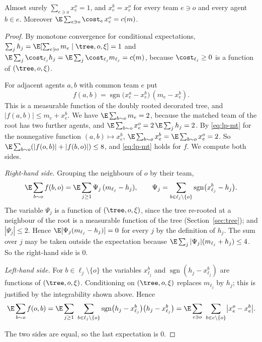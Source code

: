 \begin{lemma}\label{lem:lp-conditional}
Almost surely $\sum_{e\ni o}x^o_e=1$, and $x^b_e=x^o_e$ for every team $e\ni o$ and every
agent $b\in e$. Moreover $\E\sum_{e\ni o}\cost_e\,x^o_e=c(m)$.
\end{lemma}

\begin{proof}
By monotone convergence for conditional expectations,
$\sum_jh_j=\E[\sum_{e\ni o}m_e\mid\tree,o,\xi]=1$ and
$\E\sum_j\cost_{\ell_j}h_j=\E\sum_j\cost_{\ell_j}m_{\ell_j}=c(m)$, because $\cost_{\ell_j}\ge0$
is a function of $(\tree,o,\xi)$.

For adjacent agents $a,b$ with common team $e$ put
\[
f(a,b)=\operatorname{sgn}\bigl(x^a_e-x^b_e\bigr)\,(m_e-x^b_e).
\]
This is a measurable function of the doubly rooted decorated tree, and
$|f(a,b)|\le m_e+x^b_e$. We have $\E\sum_{b\sim o}m_e=2$, because the matched team of the
root has two further agents, and $\E\sum_{b\sim o}x^o_e=2\,\E\sum_jh_j=2$. By
\eqref{eq:lp-mt} for the nonnegative function $(a,b)\mapsto x^b_e$,
$\E\sum_{b\sim o}x^b_e=\E\sum_{b\sim o}x^o_e=2$. So
$\E\sum_{b\sim o}(|f(o,b)|+|f(b,o)|)\le8$, and \eqref{eq:lp-mt} holds for $f$. We compute
both sides.

\emph{Right-hand side.} Grouping the neighbours of $o$ by their team,
\[
\E\sum_{b\sim o}f(b,o)=\E\sum_{j\ge1}\Psi_j\,(m_{\ell_j}-h_j),\qquad
\Psi_j=\sum_{b\in\ell_j\setminus\{o\}}\operatorname{sgn}\bigl(x^b_{\ell_j}-h_j\bigr).
\]
The variable $\Psi_j$ is a function of $(\tree,o,\xi)$, since the tree re-rooted at a
neighbour of the root is a measurable function of the tree (Section~\ref{sec:tree}); and $|\Psi_j|\le2$. Hence
$\E[\Psi_j(m_{\ell_j}-h_j)]=0$ for every $j$ by the definition of $h_j$. The sum over $j$
may be taken outside the expectation because $\E\sum_j|\Psi_j|(m_{\ell_j}+h_j)\le4$. So the
right-hand side is $0$.

\emph{Left-hand side.} For $b\in\ell_j\setminus\{o\}$ the variables $x^b_{\ell_j}$ and
$\operatorname{sgn}(h_j-x^b_{\ell_j})$ are functions of $(\tree,o,\xi)$. Conditioning on
$(\tree,o,\xi)$ replaces $m_{\ell_j}$ by $h_j$; this is justified by the integrability shown
above. Hence
\[
\E\sum_{b\sim o}f(o,b)=\E\sum_{j\ge1}\ \sum_{b\in\ell_j\setminus\{o\}}
\operatorname{sgn}\bigl(h_j-x^b_{\ell_j}\bigr)\bigl(h_j-x^b_{\ell_j}\bigr)
=\E\sum_{e\ni o}\ \sum_{b\in e\setminus\{o\}}\bigl|x^o_e-x^b_e\bigr| .
\]

The two sides are equal, so the last expectation is $0$.
\end{proof}

